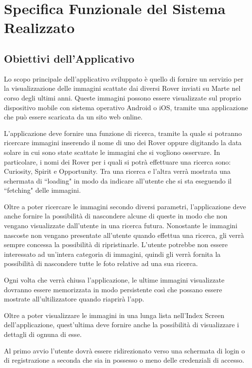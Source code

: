\chapter{Specifica Funzionale del Sistema Realizzato}
\section{Obiettivi dell'Applicativo}
Lo scopo principale dell'applicativo sviluppato \`e quello di fornire un servizio per la visualizzazione delle immagini scattate dai diversi Rover inviati su Marte nel corso degli ultimi anni.
Queste immagini possono essere visualizzate sul proprio dispositivo mobile con sistema operativo Android o iOS, tramite una applicazione che pu\`o essere scaricata da un sito web online.

L'applicazione deve fornire una funzione di ricerca, tramite la quale si potranno ricercare immagini inserendo il nome di uno dei Rover oppure digitando la data solare in cui sono state scattate le immagini che si vogliono osservare. In particolare, i nomi dei Rover per i quali si potr\`a effettuare una ricerca sono: Curiosity, Spirit e Opportunity.
Tra una ricerca e l'altra verr\`a mostrata una schermata di ``loading" in modo da indicare all'utente che si sta eseguendo il ``fetching" delle immagini.

Oltre a poter ricercare le immagini secondo diversi parametri, l'applicazione deve anche fornire la possibilit\`a di nascondere alcune di queste in modo che non vengano visualizzate dall'utente in una ricerca futura.
Nonostante le immagini nascoste non vengano presentate all'utente quando effettua una ricerca, gli verr\`a sempre concessa la possibilit\`a di ripristinarle.
L'utente potrebbe non essere interessato ad un'intera categoria di immagini, quindi gli verr\`a fornita la possibilit\`a di nascondere tutte le foto relative ad una sua ricerca.

Ogni volta che verr\`a chiusa l'applicazione, le ultime immagini visualizzate dovranno essere memorizzata in modo persistente cos\`i che possano essere mostrate all'ultilizzatore quando riaprir\`a l'app.

Oltre a poter visualizzare le immagini in una lunga lista nell'Index Screen dell'applicazione, quest'ultima deve fornire anche la possibilit\`a di visualizzare i dettagli di ognuna di esse.

Al primo avvio l'utente dovr\`a essere ridirezionato verso una schermata di login o di registrazione a seconda che sia in possesso o meno delle credenziali di accesso.

